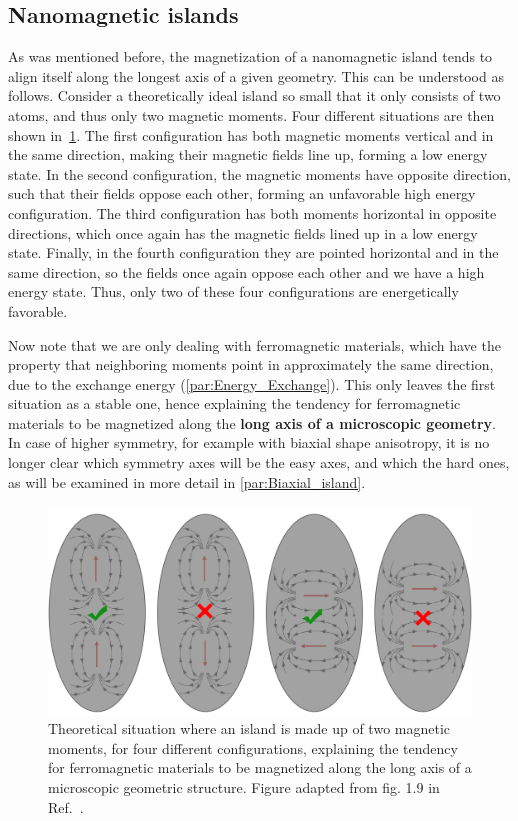 \documentclass[11pt,a4paper,english]{article}
\begin{document}
\subsection{Nanomagnetic islands}
\label{par:Intro_nanomagnetic-islands}
As was mentioned before, the magnetization of a nanomagnetic island tends to align itself along the longest axis of a given geometry. This can be understood as follows. Consider a theoretically ideal island so small that it only consists of two atoms, and thus only two magnetic moments. Four different situations are then shown in~\cref{fig:Intro_IslandEllipticPreferredDirection}.
The first configuration has both magnetic moments vertical and in the same direction, making their magnetic fields line up, forming a low energy state. In the second configuration, the magnetic moments have opposite direction, such that their fields oppose each other, forming an unfavorable high energy configuration. The third configuration has both moments horizontal in opposite directions, which once again has the magnetic fields lined up in a low energy state. Finally, in the fourth configuration they are pointed horizontal and in the same direction, so the fields once again oppose each other and we have a high energy state. Thus, only two of these four configurations are energetically favorable. \par
Now note that we are only dealing with ferromagnetic materials, which have the property that neighboring moments point in approximately the same direction, due to the exchange energy (\cref{par:Energy_Exchange}). This only leaves the first situation as a stable one, hence explaining the tendency for ferromagnetic materials to be magnetized along the \textbf{long axis of a microscopic geometry}. In case of higher symmetry, for example with biaxial shape anisotropy, it is no longer clear which symmetry axes will be the easy axes, and which the hard ones, as will be examined in more detail in \cref{par:Biaxial_island}. \par
\begin{figure}[t]
    \centering
    \includegraphics[width=0.8\columnwidth]{Figures/Introduction/NML_Carlton - Figure 1.9 adapted.png}
    \caption{Theoretical situation where an island is made up of two magnetic moments, for four different configurations, explaining the tendency for ferromagnetic materials to be magnetized along the long axis of a microscopic geometric structure. Figure adapted from fig. 1.9 in Ref.~\cite{NML_Carlton}.}
    \label{fig:Intro_IslandEllipticPreferredDirection}
\end{figure}
\end{document}

